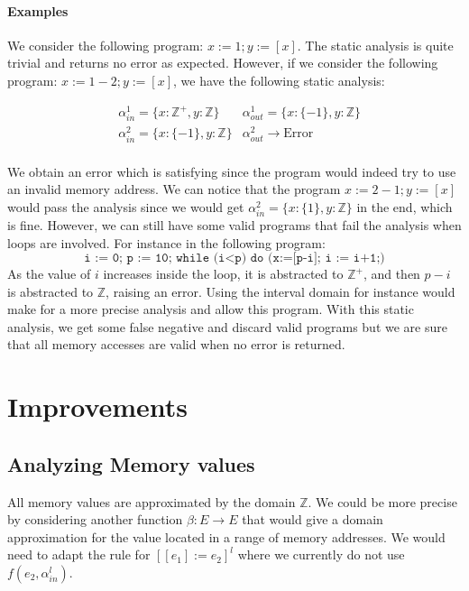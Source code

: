 \paragraph{Examples}

We consider the following program: $x:= 1; y:= [x]$.
The static analysis is quite trivial and returns no error as expected.
However, if we consider the following program: $x:= 1 - 2; y:= [x]$, we have the following static analysis:

\begin{align*}
	& \alpha_{in}^1 = \lbrace x: \mathbb{Z}^{+}, y: \mathbb{Z} \rbrace & \alpha_{out}^1 = \lbrace x: \lbrace -1 \rbrace, y: \mathbb{Z} \rbrace \\
	& \alpha_{in}^2 = \lbrace x: \lbrace -1 \rbrace, y: \mathbb{Z} \rbrace & \alpha_{out}^2 \longrightarrow \text{Error} \\
\end{align*}

We obtain an error which is satisfying since the program would indeed try to use an invalid memory address.
We can notice that the program $x:= 2 - 1; y:= [x]$ would pass the analysis since we would get $\alpha_{in}^2 = \lbrace x: \lbrace 1 \rbrace, y: \mathbb{Z} \rbrace$ in the end, which is fine.
However, we can still have some valid programs that fail the analysis when loops are involved.
For instance in the following program:
$$\texttt{i := 0; p := 10; while (i<p) do (x:=[p-i]; i := i+1;)}$$
As the value of $i$ increases inside the loop, it is abstracted to $\mathbb{Z}^{+}$, and then $p-i$ is abstracted to $\mathbb{Z}$, raising an error. Using the interval domain for instance would make for a more precise analysis and allow this program.
With this static analysis, we get some false negative and discard valid programs but we are sure that all memory accesses are valid when no error is returned.
 

\section*{Improvements}

\subsection*{Analyzing Memory values}
All memory values are approximated by the domain $\mathbb{Z}$.
We could be more precise by considering another function $\beta: E \longrightarrow E$ that would give a domain approximation for the value located in a range of memory addresses.
We would need to adapt the rule for $\left[[e_1] := e_2\right]^l$ where we currently do not use $f(e_2, \alpha_{in}^l)$.


